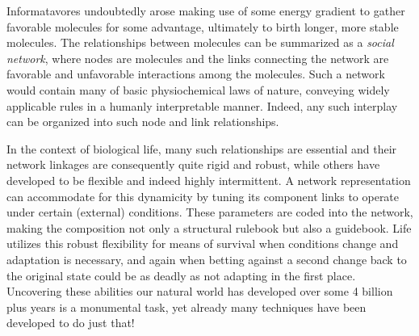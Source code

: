 Informatavores undoubtedly arose making use of some energy gradient to gather favorable molecules for some advantage, ultimately to birth longer, more stable molecules. The relationships between molecules can be summarized as a \emph{social network}, where nodes are molecules and the links connecting the network are favorable and unfavorable interactions among the molecules. Such a network would contain many of basic physiochemical laws of nature, conveying widely applicable rules in a humanly interpretable manner. Indeed, any such interplay can be organized into such node and link relationships.

In the context of biological life, many such relationships are essential and their network linkages are consequently quite rigid and robust, while others have developed to be flexible and indeed highly intermittent. A network representation can accommodate for this dynamicity by tuning its component links to operate under certain (external) conditions. These parameters are coded into the network, making the composition not only a structural rulebook but also a guidebook. Life utilizes this robust flexibility for means of survival when conditions change and adaptation is necessary, and again when betting against a second change back to the original state could be as deadly as not adapting in the first place. Uncovering these abilities our natural world has developed over some 4 billion plus years is a monumental task, yet already many techniques have been developed to do just that!

